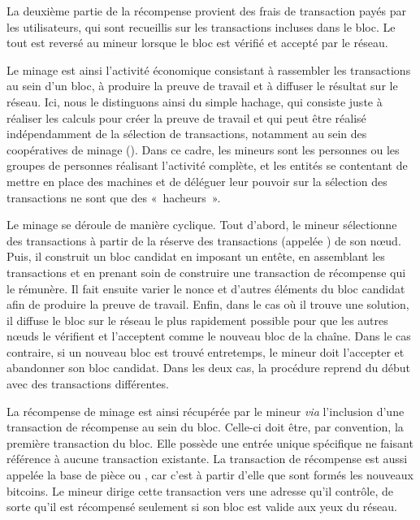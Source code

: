 La deuxième partie de la récompense provient des frais de transaction payés par les utilisateurs, qui sont recueillis sur les transactions incluses dans le bloc. Le tout est reversé au mineur lorsque le bloc est vérifié et accepté par le réseau. %

Le minage est ainsi l'activité économique consistant à rassembler les transactions au sein d'un bloc, à produire la preuve de travail et à diffuser le résultat sur le réseau. Ici, nous le distinguons ainsi du simple hachage, qui consiste juste à réaliser les calculs pour créer la preuve de travail et qui peut être réalisé indépendamment de la sélection de transactions, notamment au sein des coopératives de minage (). Dans ce cadre, les mineurs sont les personnes ou les groupes de personnes réalisant l'activité complète, et les entités se contentant de mettre en place des machines et de déléguer leur pouvoir sur la sélection des transactions ne sont que des «~hacheurs~».


Le minage se déroule de manière cyclique. Tout d'abord, le mineur sélectionne des transactions à partir de la réserve des transactions (appelée ) de son nœud. Puis, il construit un bloc candidat en imposant un entête, en assemblant les transactions et en prenant soin de construire une transaction de récompense qui le rémunère. Il fait ensuite varier le nonce et d'autres éléments du bloc candidat afin de produire la preuve de travail. Enfin, dans le cas où il trouve une solution, il diffuse le bloc sur le réseau le plus rapidement possible pour que les autres nœuds le vérifient et l'acceptent comme le nouveau bloc de la chaîne. Dans le cas contraire, si un nouveau bloc est trouvé entretemps, le mineur doit l'accepter et abandonner son bloc candidat. Dans les deux cas, la procédure reprend du début avec des transactions différentes.

La récompense de minage est ainsi récupérée par le mineur \emph{via} l'inclusion d'une transaction de récompense au sein du bloc. Celle-ci doit être, par convention, la première transaction du bloc. Elle possède une entrée unique spécifique ne faisant référence à aucune transaction existante. La transaction de récompense est aussi appelée la base de pièce ou , car c'est à partir d'elle que sont formés les nouveaux bitcoins. Le mineur dirige cette transaction vers une adresse qu'il contrôle, de sorte qu'il est récompensé seulement si son bloc est valide aux yeux du réseau.

